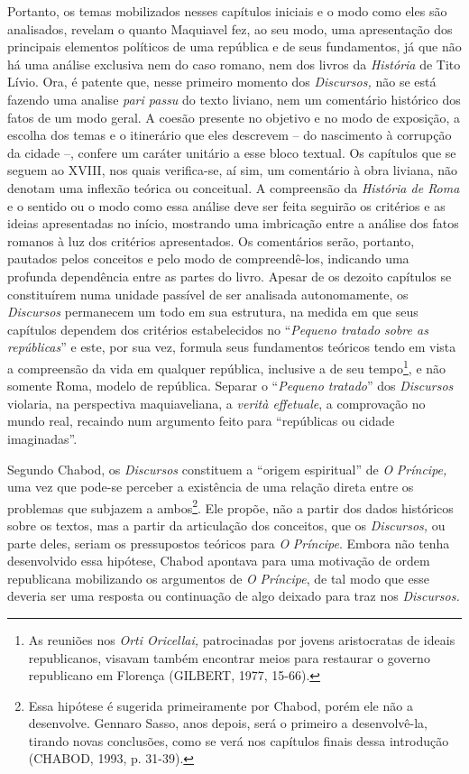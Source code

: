 Portanto, os temas mobilizados nesses capítulos iniciais e o modo como
eles são analisados, revelam o quanto Maquiavel fez, ao seu modo, uma
apresentação dos principais elementos políticos de uma república e de
seus fundamentos, já que não há uma análise exclusiva nem do caso
romano, nem dos livros da \emph{História} de Tito Lívio. Ora, é patente
que, nesse primeiro momento dos \emph{Discursos,} não se está fazendo
uma analise \emph{pari passu} do texto liviano, nem um comentário
histórico dos fatos de um modo geral. A coesão presente no objetivo e no
modo de exposição, a escolha dos temas e o itinerário que eles descrevem
-- do nascimento à corrupção da cidade --, confere um caráter unitário a
esse bloco textual. Os capítulos que se seguem ao XVIII, nos quais
verifica-se, aí sim, um comentário à obra liviana, não denotam uma
inflexão teórica ou conceitual. A compreensão da \emph{História de Roma}
e o sentido ou o modo como essa análise deve ser feita seguirão os
critérios e as ideias apresentadas no início, mostrando uma imbricação
entre a análise dos fatos romanos à luz dos critérios apresentados. Os
comentários serão, portanto, pautados pelos conceitos e pelo modo de
compreendê-los, indicando uma profunda dependência entre as partes do
livro. Apesar de os dezoito capítulos se constituírem numa unidade
passível de ser analisada autonomamente, os \emph{Discursos} permanecem
um todo em sua estrutura, na medida em que seus capítulos dependem dos
critérios estabelecidos no ``\emph{Pequeno tratado sobre as
repúblicas}'' e este, por sua vez, formula seus fundamentos teóricos
tendo em vista a compreensão da vida em qualquer república, inclusive a
de seu tempo\footnote{As reuniões nos \emph{Orti Oricellai,}
  patrocinadas por jovens aristocratas de ideais republicanos, visavam
  também encontrar meios para restaurar o governo republicano em
  Florença (GILBERT, 1977, 15-66).}, e não somente Roma, modelo de
república. Separar o ``\emph{Pequeno tratado}'' dos \emph{Discursos}
violaria, na perspectiva maquiaveliana, a \emph{verità effetuale}, a
comprovação no mundo real, recaindo num argumento feito para
``repúblicas ou cidade imaginadas''.

Segundo Chabod, os \emph{Discursos} constituem a ``origem espiritual''
de \emph{O} \emph{Príncipe,} uma vez que pode-se perceber a existência
de uma relação direta entre os problemas que subjazem a ambos\footnote{Essa
  hipótese é sugerida primeiramente por Chabod, porém ele não a
  desenvolve. Gennaro Sasso, anos depois, será o primeiro a
  desenvolvê-la, tirando novas conclusões, como se verá nos capítulos
  finais dessa introdução (CHABOD, 1993, p. 31-39).}. Ele propõe, não a
partir dos dados históricos sobre os textos, mas a partir da articulação
dos conceitos, que os \emph{Discursos,} ou parte deles, seriam os
pressupostos teóricos para \emph{O} \emph{Príncipe}. Embora não tenha
desenvolvido essa hipótese, Chabod apontava para uma motivação de ordem
republicana mobilizando os argumentos de \emph{O} \emph{Príncipe}, de
tal modo que esse deveria ser uma resposta ou continuação de algo
deixado para traz nos \emph{Discursos.}

